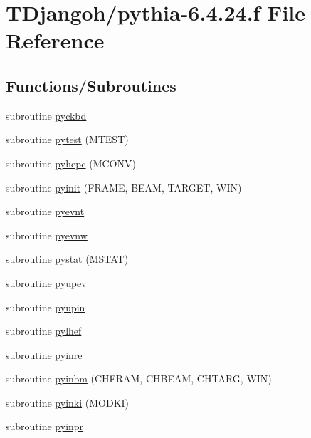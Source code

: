 \hypertarget{pythia-6_84_824_8f}{\section{T\+Djangoh/pythia-\/6.4.24.f File Reference}
\label{pythia-6_84_824_8f}
}
\subsection*{Functions/\+Subroutines}
\begin{DoxyCompactItemize}
\item 
subroutine \hyperlink{pythia-6_84_824_8f_a6655a210e16c775882e736cb73e6fba1}{pyckbd}
\item 
subroutine \hyperlink{pythia-6_84_824_8f_a4cc0e611278607d6b413b5cecdfe16c3}{pytest} (M\+T\+E\+S\+T)
\item 
subroutine \hyperlink{pythia-6_84_824_8f_a75df891b8b5e5b18d29325afa1f5e632}{pyhepc} (M\+C\+O\+N\+V)
\item 
subroutine \hyperlink{pythia-6_84_824_8f_aac00ac3ccd923c2c3dc37e2b89a9f025}{pyinit} (F\+R\+A\+M\+E, B\+E\+A\+M, T\+A\+R\+G\+E\+T, W\+I\+N)
\item 
subroutine \hyperlink{pythia-6_84_824_8f_ac81fa418f8cd77b0873b2de2a4140933}{pyevnt}
\item 
subroutine \hyperlink{pythia-6_84_824_8f_a83ae6561ab82fd7af8b1b3e511f477ac}{pyevnw}
\item 
subroutine \hyperlink{pythia-6_84_824_8f_a6776838d34f1f049686d19132f43a249}{pystat} (M\+S\+T\+A\+T)
\item 
subroutine \hyperlink{pythia-6_84_824_8f_ae7cb37215e5a38b3fb0529c9996646e6}{pyupev}
\item 
subroutine \hyperlink{pythia-6_84_824_8f_a710b769b07c1b2a27ba2ef3108e84bed}{pyupin}
\item 
subroutine \hyperlink{pythia-6_84_824_8f_a2a33a24facc5f203a1b7ecccd4374c93}{pylhef}
\item 
subroutine \hyperlink{pythia-6_84_824_8f_a6fa4e6a261de929c41d509ff9aadde33}{pyinre}
\item 
subroutine \hyperlink{pythia-6_84_824_8f_af14ac174afbf502859c3196479097c50}{pyinbm} (C\+H\+F\+R\+A\+M, C\+H\+B\+E\+A\+M, C\+H\+T\+A\+R\+G, W\+I\+N)
\item 
subroutine \hyperlink{pythia-6_84_824_8f_ae42caa9ba7af0a1b008fa608c8941e43}{pyinki} (M\+O\+D\+K\+I)
\item 
subroutine \hyperlink{pythia-6_84_824_8f_a29c8fd890d3cef2da967153af66836ba}{pyinpr}

\end{DoxyCompactItemize}
